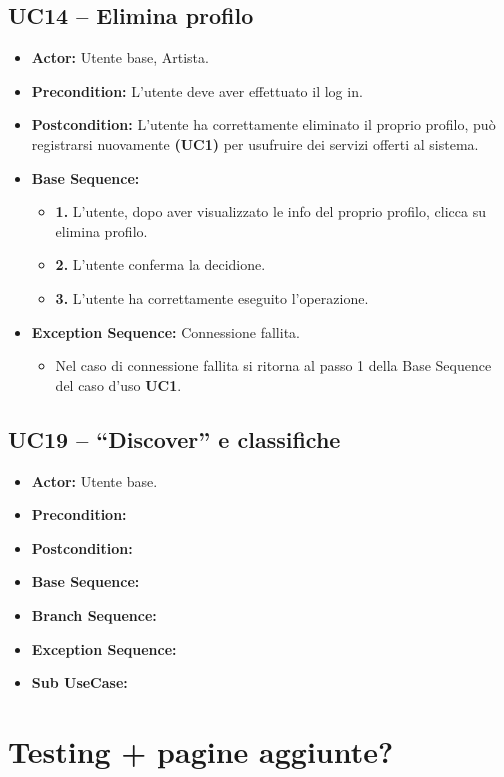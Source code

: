 \subsection{UC14 -- Elimina profilo}
\begin{itemize}
    \item \textbf{Actor:} Utente base, Artista.
    \item \textbf{Precondition:} L'utente deve aver effettuato il log in.
    \item \textbf{Postcondition:} L'utente ha correttamente eliminato il proprio profilo, può registrarsi nuovamente \textbf{(UC1)} per usufruire dei servizi offerti al sistema. 
    \item \textbf{Base Sequence:}
    \begin{itemize}
        \item \textbf{1.} L'utente, dopo aver visualizzato le info del proprio profilo, clicca su elimina profilo.
        \item \textbf{2.} L'utente conferma la decidione.
        \item \textbf{3.} L'utente ha correttamente eseguito l'operazione.
    \end{itemize}
    \item \textbf{Exception Sequence:} Connessione fallita.
    \begin{itemize}
        \item Nel caso di connessione fallita si ritorna al passo 1 della Base Sequence del caso d'uso \textbf{UC1}.
    \end{itemize}
\end{itemize}
\vspace{1cm}

\subsection{UC19 -- ``Discover'' e classifiche}
\begin{itemize}
    \item \textbf{Actor:} Utente base.
    \item \textbf{Precondition:}
    \item \textbf{Postcondition:}
    \item \textbf{Base Sequence:}
    \item \textbf{Branch Sequence:}
    \item \textbf{Exception Sequence:}
    \item \textbf{Sub UseCase:}
\end{itemize}
\vspace{1cm}


\section{Testing + pagine aggiunte?}